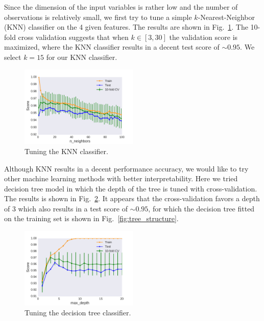 \documentclass{article}
\begin{document}
Since the dimension of the input variables is rather low and the number of
observations is relatively small, we first try to tune a simple
$k$-Nearest-Neighbor (KNN) classifier on the 4 given features. The results are
shown in Fig.~\ref{fig:knn_tune}. The 10-fold cross validation suggests that
when $k\in[3, 30]$ the validation score is maximized, where the KNN classifier 
results in a decent test score of $\sim0.95$. We select $k=15$ for our KNN
classifier.

\begin{figure}[h]
  \centering
  \includegraphics[width=0.5\textwidth]{figs/knn_tuning.pdf}
  \caption{Tuning the KNN classifier.}
  \label{fig:knn_tune}
\end{figure}

Although KNN results in a decent performance accuracy, we would like to try
other machine learning methods with better interpretability. Here we tried
decision tree model in which the depth of the tree is tuned with
cross-validation. The results is shown in Fig.~\ref{fig:tree_tune}. It appears
that the cross-validation favors a depth of 3 which also results in a test score
of $\sim0.95$, for which the decision tree fitted on the training set is shown
in Fig.~\ref{fig:tree_structure}.

\begin{figure}[h]
  \centering
  \includegraphics[width=0.5\textwidth]{figs/tree_tuning.pdf}
  \caption{Tuning the decision tree classifier.}
  \label{fig:tree_tune}
\end{figure}
\end{document}
